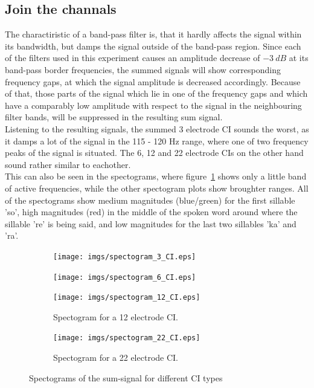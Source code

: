 \documentclass{scrartcl}			%
\begin{document}
\subsection{Join the channals}
The charactiristic of a band-pass filter is, that it hardly affects the signal within its bandwidth, but damps the signal outside of the band-pass region. Since each of the filters used in this experiment causes an amplitude decrease of $\SI{-3}{dB}$ at its band-pass border frequencies, the summed signals will show corresponding frequency gaps, at which the signal amplitude is decreased accordingly. Because of that, those parts of the signal which lie in one of the frequency gaps and which have a comparably low amplitude with respect to the signal in the neighbouring filter bands, will be suppressed in the resulting sum signal.\\Listening to the resulting signals, the summed 3 electrode CI sounds the worst, as it damps a lot of the signal in the 115 - 120 Hz range, where one of two frequency peaks of the signal is situated. The 6, 12 and 22 electrode CIs on the other hand sound rather similar to eachother.\\ This can also be seen in the spectograms, where figure~\ref{fig:spec_ci_3} shows only a little band of active frequencies, while the other spectogram plots show broughter ranges. All of the spectograms show medium magnitudes (blue/green) for the first sillable 'so', high magnitudes (red) in the middle of the spoken word around where the sillable 're' is being said, and low magnitudes for the last two sillables 'ka' and 'ra'.
\begin{figure}[H]
\centering
	 \begin{subfigure}[b]{0.49\linewidth}
    		\texttt{[image: imgs/spectogram\_3\_CI.eps]}
   		 \label{fig:spec_ci_3} 
   		 \end{subfigure}
   		 \begin{subfigure}[b]{0.49\linewidth}
    		\texttt{[image: imgs/spectogram\_6\_CI.eps]}
   		 \label{fig:spec_ci_6} 
   		 \end{subfigure}
   		 \begin{subfigure}[b]{0.49\linewidth}
   		 \texttt{[image: imgs/spectogram\_12\_CI.eps]}
   		 \caption{Spectogram for a 12 electrode CI.} 
   		 \label{fig:spec_ci_12} 
   		 \end{subfigure}
   		 \begin{subfigure}[b]{0.49\linewidth}
   		 \texttt{[image: imgs/spectogram\_22\_CI.eps]}
   		 \caption{Spectogram for a 22 electrode CI.} 
   		 \label{fig:spec_ci_22} 
   		 \end{subfigure}
   		\caption{Spectograms of the sum-signal for different CI types}
   		\label{fig:spectograms}
\end{figure}
\end{document}
